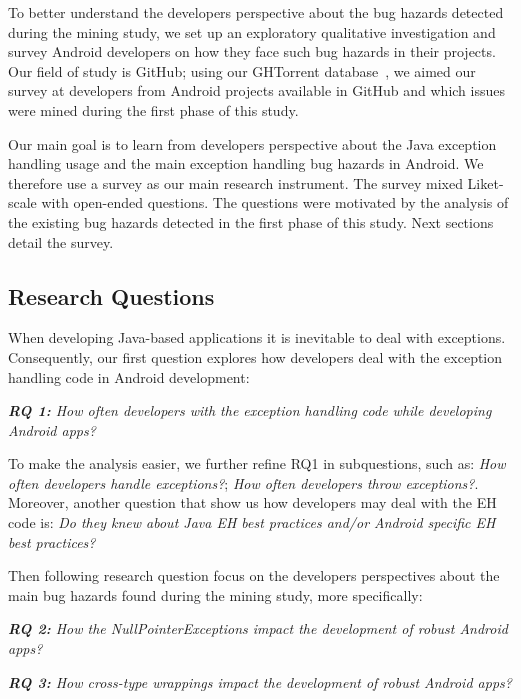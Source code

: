 To better understand the developers perspective about the bug hazards detected during the mining study, we set up an exploratory qualitative investigation and survey Android developers on how they face such bug hazards in their projects. Our field of study is GitHub; using our GHTorrent database~\cite{Gousi13}, we aimed our survey at developers from Android projects available in GitHub and which issues were mined during the first phase of this study. 

Our main goal is to learn from developers perspective about the Java exception handling usage and the main exception handling bug hazards in Android. We therefore use a survey as our main research instrument. The survey mixed  Liket-scale with open-ended questions. The questions were motivated by the analysis of the existing bug hazards detected in the first phase of this study. Next sections detail the survey.



\subsection{Research Questions}

When developing Java-based applications it is inevitable to deal with exceptions. Consequently, our first question explores how developers deal with the exception handling code in Android development:

\emph{\textbf{RQ 1:} How often developers with the exception handling code while developing Android apps?} 

To make the analysis easier, we further refine RQ1 in subquestions, such as: \emph{How often developers handle exceptions?}; \emph{How often developers throw exceptions?}. Moreover, another question that show us how developers may deal with the EH code is: \emph{Do they knew about Java EH best practices and/or Android specific EH best practices?}
 
Then following research question focus on the developers perspectives about the main bug hazards found during the mining study, more specifically: 

\emph{\textbf{RQ 2:} How the NullPointerExceptions impact the development of robust Android apps?}

\emph{\textbf{RQ 3:} How cross-type wrappings impact the development of robust Android apps?}

